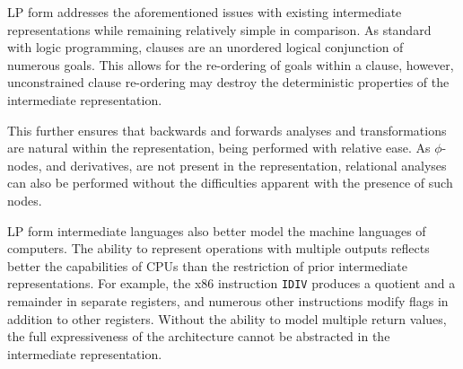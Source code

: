 LP form addresses the aforementioned issues with existing intermediate representations while remaining relatively simple in comparison. As standard with logic programming, clauses are an unordered logical conjunction of numerous goals. This allows for the re-ordering of goals within a clause, however, unconstrained clause re-ordering may destroy the deterministic properties of the intermediate representation. 

This further ensures that backwards and forwards analyses and transformations are natural within the representation, being performed with relative ease. As $\phi$-nodes, and derivatives, are not present in the representation, relational analyses can also be performed without the difficulties apparent with the presence of such nodes.

LP form intermediate languages also better model the machine languages of computers. The ability to represent operations with multiple outputs reflects better the capabilities of CPUs than the restriction of prior intermediate representations. For example, the x86 instruction \texttt{IDIV} produces a quotient and a remainder in separate registers, and numerous other instructions modify flags in addition to other registers. Without the ability to model multiple return values, the full expressiveness of the architecture cannot be abstracted in the intermediate representation.
